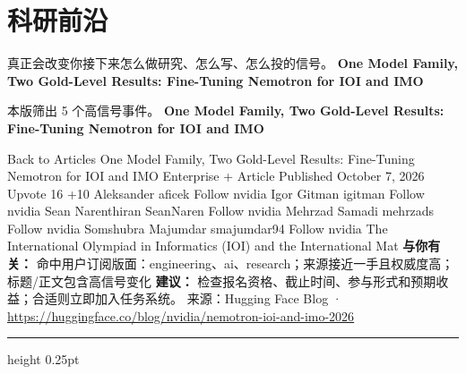 \documentclass[10.5pt]{ctexart}
\begin{document}
\section*{科研前沿}
{\color{ormuted} 真正会改变你接下来怎么做研究、怎么写、怎么投的信号。}
\vspace{2mm}
{\LARGE\bfseries One Model Family, Two Gold-Level Results: Fine-Tuning Nemotron for IOI and IMO}\par
\vspace{1mm}
{\color{ormuted} 本版筛出 5 个高信号事件。}
\vspace{3mm}
{\Large\bfseries One Model Family, Two Gold-Level Results: Fine-Tuning Nemotron for IOI and IMO}\par
Back to Articles One Model Family, Two Gold-Level Results: Fine-Tuning Nemotron for IOI and IMO Enterprise + Article Published October 7, 2026 Upvote 16 +10 Aleksander aficek Follow nvidia Igor Gitman igitman Follow nvidia Sean Narenthiran SeanNaren Follow nvidia Mehrzad Samadi mehrzads Follow nvidia Somshubra Majumdar smajumdar94 Follow nvidia The International Olympiad in Informatics (IOI) and the International Mat
\textbf{与你有关：} 命中用户订阅版面：engineering、ai、research；来源接近一手且权威度高；标题/正文包含高信号变化
\textbf{建议：} 检查报名资格、截止时间、参与形式和预期收益；合适则立即加入任务系统。
{\footnotesize\color{ormuted} 来源：Hugging Face Blog · \url{https://huggingface.co/blog/nvidia/nemotron-ioi-and-imo-2026}}
\vspace{4mm}
\hrule height 0.25pt
\vspace{3mm}
\end{document}
